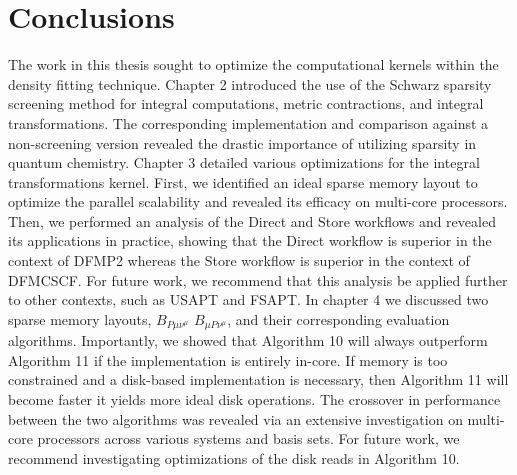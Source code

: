 \chapter{Conclusions}

The work in this thesis sought to optimize the computational kernels within the density fitting technique.
Chapter 2 introduced the use of the Schwarz sparsity screening method for integral computations, metric contractions, and integral transformations.
The corresponding implementation and comparison against a non-screening version revealed the drastic importance of 
utilizing sparsity in quantum chemistry.
Chapter 3 detailed various optimizations for the integral transformations kernel. First, we identified an ideal sparse memory layout to 
optimize the parallel scalability and revealed its efficacy on multi-core processors. Then, we performed an analysis of 
the Direct and Store workflows and revealed its applications in practice, showing that the Direct workflow is superior in 
the context of DFMP2 whereas the Store workflow is superior in the context of DFMCSCF. 
For future work, we recommend that this analysis be applied further to other contexts, such as
USAPT and FSAPT. In chapter 4 we discussed two sparse memory layouts, $B_{P \mu \nu^{\mu}}$ $B_{\mu P \nu^{\mu}}$, and their corresponding
evaluation algorithms. Importantly, we showed that Algorithm 10 will always outperform Algorithm 11 if the implementation is entirely in-core.
If memory is too constrained and a disk-based implementation is necessary, then Algorithm 11 will become faster 
it yields more ideal disk operations. The crossover in performance between the two algorithms was revealed via an extensive investigation on
multi-core processors across various systems and basis sets. For future work, we recommend investigating optimizations of the disk reads
in Algorithm 10. 


